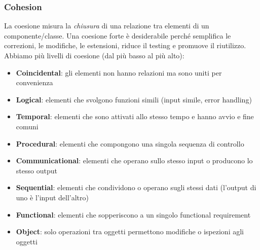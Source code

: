 \documentclass[11pt]{article}
\begin{document}
\subsubsection{Cohesion}
La coesione misura la \textit{chiusura} di una relazione tra elementi di un componente/classe. Una coesione forte è desiderabile perché semplifica le correzioni, le modifiche, le estensioni, riduce il testing e promuove il riutilizzo. 
Abbiamo più livelli di coesione (dal più basso al più alto):
\begin{itemize}
    \item \textbf{Coincidental}: gli elementi non hanno relazioni ma sono uniti per convenienza
    \item \textbf{Logical}: elementi che svolgono funzioni simili (input simile, error handling)
    \item \textbf{Temporal}: elementi che sono attivati allo stesso tempo e hanno avvio e fine comuni 
    \item \textbf{Procedural}: elementi che compongono una singola sequenza di controllo 
    \item \textbf{Communicational}: elementi che operano sullo stesso input o producono lo stesso output
    \item \textbf{Sequential}: elementi che condividono o operano sugli stessi dati (l'output di uno è l'input dell'altro)
    \item \textbf{Functional}: elementi che sopperiscono a un singolo functional requirement
    \item \textbf{Object}: solo operazioni tra oggetti permettono modifiche o ispezioni agli oggetti 
\end{itemize}
\end{document}
